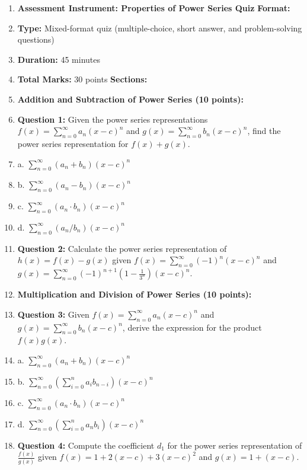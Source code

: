 \begin{enumerate}
    \item \textbf{Assessment Instrument: Properties of Power Series Quiz} \textbf{Format:}
    \item \textbf{Type:} Mixed-format quiz (multiple-choice, short answer, and problem-solving questions)
    \item \textbf{Duration:} 45 minutes
    \item \textbf{Total Marks:} 30 points \textbf{Sections:}
    \item \textbf{Addition and Subtraction of Power Series (10 points):}
    \item \textbf{Question 1:} Given the power series representations \( f(x) = \sum_{n=0}^\infty a_n (x - c)^n \) and \( g(x) = \sum_{n=0}^\infty b_n (x - c)^n \), find the power series representation for \( f(x) + g(x) \).
    \item a. \( \sum_{n=0}^\infty (a_n + b_n) (x - c)^n \)
    \item b. \( \sum_{n=0}^\infty (a_n - b_n) (x - c)^n \)
    \item c. \( \sum_{n=0}^\infty (a_n \cdot b_n) (x - c)^n \)
    \item d. \( \sum_{n=0}^\infty (a_n / b_n) (x - c)^n \)
    \item \textbf{Question 2:} Calculate the power series representation of \( h(x) = f(x) - g(x) \) given \( f(x) = \sum_{n=0}^\infty (-1)^n (x - c)^n \) and \( g(x) = \sum_{n=0}^\infty (-1)^{n+1} \left(1 - \frac{1}{3^n}\right) (x - c)^n \).
    \item \textbf{Multiplication and Division of Power Series (10 points):}
    \item \textbf{Question 3:} Given \( f(x) = \sum_{n=0}^\infty a_n (x - c)^n \) and \( g(x) = \sum_{n=0}^\infty b_n (x - c)^n \), derive the expression for the product \( f(x)g(x) \).
    \item a. \( \sum_{n=0}^\infty (a_n + b_n) (x - c)^n \)
    \item b. \( \sum_{n=0}^\infty \left(\sum_{i=0}^n a_i b_{n-i}\right) (x - c)^n \)
    \item c. \( \sum_{n=0}^\infty (a_n \cdot b_n) (x - c)^n \)
    \item d. \( \sum_{n=0}^\infty \left(\sum_{i=0}^n a_n b_i\right) (x - c)^n \)
    \item \textbf{Question 4:} Compute the coefficient \( d_1 \) for the power series representation of \( \frac{f(x)}{g(x)} \) given \( f(x) = 1 + 2(x - c) + 3(x - c)^2 \) and \( g(x) = 1 + (x - c) \).

\end{enumerate}
